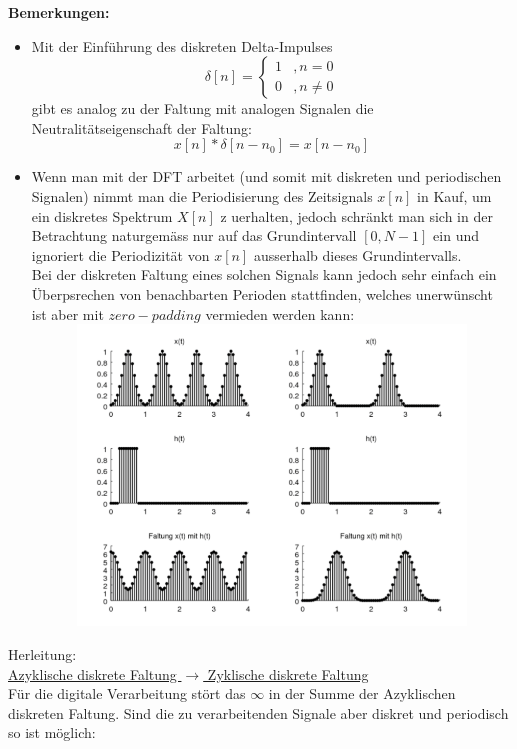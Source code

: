 \documentclass[12pt,a4paper]{scrartcl}
\begin{document}
    \noindent  \textbf{Bemerkungen:}
    \begin{itemize}
      \item Mit der Einführung des diskreten Delta-Impulses $$ \delta [n] =  \begin{cases} 1 &, n = 0 \\ 0 &, n \neq 0 \end{cases} $$
      gibt es analog zu der Faltung mit analogen Signalen die Neutralitätseigenschaft der Faltung: $$ x[n] * \delta [n-n_0] = x[n - n_0]$$
      \item Wenn man mit der DFT arbeitet (und somit mit diskreten und periodischen Signalen) nimmt man die Periodisierung des Zeitsignals $x[n]$ in Kauf, um ein diskretes Spektrum $X[n]$ z uerhalten, 
      jedoch schränkt man sich in der Betrachtung naturgemäss nur auf das Grundintervall $[0, N-1]$ ein und ignoriert die Periodizität 
      von $x[n]$ ausserhalb dieses Grundintervalls. \\
      Bei der diskreten Faltung eines solchen Signals kann jedoch sehr einfach ein Überpsrechen von benachbarten Perioden stattfinden, 
      welches unerwünscht ist aber mit $zero-padding$ vermieden werden kann: \\ \includegraphics[height = 8cm, width = 15cm]{Pictures/DiskreteFaltung.png}
    \end{itemize}

    \noindent  Herleitung: \\
    \noindent \underline{Azyklische diskrete Faltung $\to$ Zyklische diskrete Faltung} \\
    \noindent Für die digitale Verarbeitung stört das $\infty$ in der Summe der Azyklischen diskreten Faltung. Sind die zu verarbeitenden Signale aber diskret und periodisch so ist möglich: \\
\end{document}
